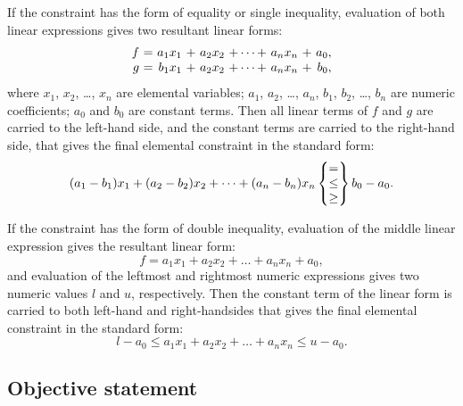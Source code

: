 \documentclass[10pt]{article}
\begin{document}
If the constraint has the form of equality or single inequality,
evaluation of both linear expressions gives two resultant linear forms:
$$\begin{array}{r@{\ }c@{\ }r@{\ }c@{\ }r@{\ }c@{\ }r@{\ }c@{\ }r}
f&=&a_1x_1&+&a_2x_2&+\dots+&a_nx_n&+&a_0,\\
g&=&b_1x_1&+&a_2x_2&+\dots+&a_nx_n&+&b_0,\\
\end{array}$$
where $x_1$, $x_2$, \dots, $x_n$ are elemental variables; $a_1$, $a_2$,
\dots, $a_n$, $b_1$, $b_2$, \dots, $b_n$ are numeric coefficients;
$a_0$ and $b_0$ are constant terms. Then all linear terms of $f$ and
$g$ are carried to the left-hand side, and the constant terms are
carried to the right-hand side, that gives the final elemental
constraint in the standard form:
$$(a_1-b_1)x_1+(a_2-b_2)x_2+\dots+(a_n-b_n)x_n\left\{
\begin{array}{@{}c@{}}=\\\leq\\\geq\\\end{array}\right\}b_0-a_0.$$

If the constraint has the form of double inequality, evaluation of the
middle linear expression gives the resultant linear form:
$$f=a_1x_1+a_2x_2+\dots+a_nx_n+a_0,$$
and evaluation of the leftmost and rightmost numeric expressions gives
two numeric values $l$ and $u$, respectively. Then the constant term of
the linear form is carried to both left-hand and right-handsides that
gives the final elemental constraint in the standard form:
$$l-a_0\leq a_1x_1+a_2x_2+\dots+a_nx_n\leq u-a_0.$$

\subsection{Objective statement}

\medskip


\setlength{\leftmargini}{60pt}
\end{document}
